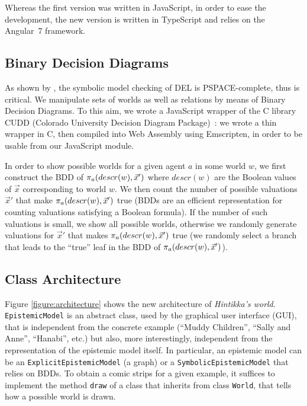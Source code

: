 
Whereas the first version was written in JavaScript, in order to ease the development, the new version is written in TypeScript and relies on the Angular~7 framework.

\subsection{Binary Decision Diagrams}

As shown by \citet{DBLP:conf/atal/CharrierS17}, the symbolic model checking of DEL is PSPACE-complete, thus is critical. We manipulate sets of worlds as well as relations by means of Binary Decision Diagrams. To this aim, we wrote a JavaScript wrapper of the C library CUDD (Colorado University Decision Diagram Package)~\cite{DBLP:journals/sttt/Somenzi01}: we wrote a thin wrapper in C, then compiled into Web Assembly using Emscripten, in order to be usable from our JavaScript module.

In order to show possible worlds for a given agent $a$ in some world $w$, we first construct the BDD of $\pi_{a}(descr(w), \vec x')$ where $descr(w)$ are the Boolean values of $\vec x$ corresponding to world $w$. We then count the number of possible valuations $\vec x'$ that make $\pi_{a}(descr(w), \vec x')$ true (BDDs are an efficient representation for counting valuations satisfying a Boolean formula). If the number of such valuations is small, we show all possible worlds, otherwise we randomly generate valuations for $\vec x'$ that makes $\pi_{a}(descr(w), \vec x')$ true (we randomly select a branch that leads to the ``true'' leaf in the BDD of $\pi_{a}(descr(w), \vec x')$).

\subsection{Class Architecture}

Figure \ref{figure:architecture} shows the new architecture of \emph{Hintikka's world}. \texttt{EpistemicModel} is an abstract class, used by the graphical user interface (GUI), that is independent from the concrete example (``Muddy Children'', ``Sally and Anne'', ``Hanabi'', etc.) but also, more interestingly, independent from the representation of the epistemic model itself. In particular, an epistemic model can be an \texttt{ExplicitEpistemicModel} (a graph) or a \texttt{SymbolicEpistemicModel} that relies on BDDs. To obtain a comic strips for a given example, it suffices to implement the method \texttt{draw} of a class that inherits from class \texttt{World}, that tells how a possible world is drawn.


